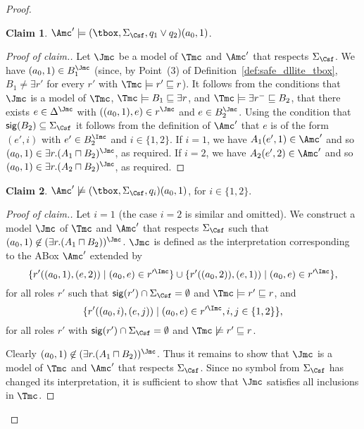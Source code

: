 \documentclass{lmcs}
\theoremstyle{definition}
\newtheorem{claim}{Claim}
\let\OriginalQedSymbol\qedsymbol
\renewcommand{\qedsymbol}{\OriginalQedSymbol\setcounter{claim}{0}}
\let\NormalQedSymbol\qedsymbol
\newenvironment{clmproof}[1]{\renewcommand{\qedsymbol}{$\dashv$}\begin{proof}[Proof of claim.]\space#1}{\end{proof}\renewcommand{\qedsymbol}{\NormalQedSymbol}}
\begin{document}
\begin{proof}
\begin{claim}
$\Amc'\models(\tbox,\Sigma_\Csf,q_1\vee q_{2})(a_{0},1)$.
\end{claim}
\begin{clmproof}
Let $\Jmc$ be a model of $\Tmc$ and $\Amc'$ that respects
$\Sigma_\Csf$. We have $(a_{0},1)\in B_{1}^{\Jmc}$ (since, by
Point~(3) of Definition~\ref{def:safe_dllite_tbox}, $B_{1}\not=\exists r'$ for every $r'$ with $\Tmc\models r' \sqsubseteq r$).  
It follows from the conditions that $\Jmc$ is a model of $\Tmc$, $\Tmc\models B_{1}\sqsubseteq \exists r$, and 
$\Tmc\models \exists r^{-}\sqsubseteq B_{2}$, that there exists $e\in \Delta^{\Jmc}$ with
$((a_{0},1),e)\in r^{\Jmc}$ and $e\in B_{2}^{\Jmc}$. Using the condition that ${\sf sig}(B_{2})\subseteq \Sigma_\Csf$
it follows from the definition of $\Amc'$ that $e$ is of the form $(e',i)$ with $e'\in B_{2}^{\Imc}$ and $i\in\{1,2\}$.
If $i=1$, we have $A_{1}(e',1)\in \Amc'$ and so $(a_{0},1)\in \exists r.(A_{1} \sqcap B_{2})^{\Jmc}$, as required. 
If $i=2$, we have $A_{2}(e',2)\in \Amc'$ and so $(a_{0},1)\in \exists r.(A_{2} \sqcap
B_{2})^{\Jmc}$, as required.
\end{clmproof}
\begin{claim}
$\Amc'\not\models(\tbox,\Sigma_\Csf,q_i)(a_{0},1)$, for $i\in \{1,2\}$.
\end{claim}
\begin{clmproof}
Let $i=1$ (the case $i=2$ is similar and omitted). We construct a model $\Jmc$ of $\Tmc$ and $\Amc'$ that respects
$\Sigma_\Csf$ such that $(a_{0},1)\not\in (\exists r.(A_{1} \sqcap B_{2}))^{\Jmc}$. 
$\Jmc$ is defined as the interpretation corresponding to the ABox $\Amc'$ extended by
$$
 \{r'((a_{0},1),(e,2)) \mid (a_{0},e)\in r'^{\Imc}\} \cup
 \{r'((a_{0},2)),(e,1))\mid (a_{0},e)\in r'^{\Imc}\},
$$
for all roles $r'$ such that ${\sf sig}(r')\cap \Sigma_\Csf=\emptyset$ and
$\Tmc\models r'\sqsubseteq r$, and
$$
\{r'((a_{0},i),(e,j)) \mid (a_{0},e)\in r'^{\Imc}, i,j\in \{1,2\}\},
$$
for all roles $r'$ with ${\sf sig}(r')\cap \Sigma_\Csf=\emptyset$ and
$\Tmc\not\models r'\sqsubseteq r$.

Clearly $(a_{0},1)\not\in (\exists r.(A_{1} \sqcap B_{2}))^{\Jmc}$.
Thus it remains to show that $\Jmc$ is a model of $\Tmc$ and
$\Amc'$ that respects $\Sigma_\Csf$.  Since no symbol from
$\Sigma_\Csf$ has changed its interpretation, it is sufficient to show
that $\Jmc$ satisfies all inclusions in $\Tmc$.


\end{clmproof}
\end{proof}
\end{document}
